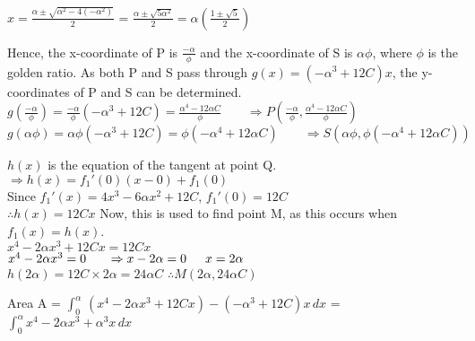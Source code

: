 \documentclass{homework}
\begin{document}
\begin{flushleft}
\begin{paracol}{2}
$x=\frac{\alpha\pm \sqrt{\alpha^2-4(-\alpha^2)}}{2}$ = $\frac{\alpha\pm \sqrt{5\alpha^2}}{2}=\alpha(\frac{1\pm\sqrt{5}}{2})$ 
\end{paracol}
\vspace{1.7em}
Hence, the x-coordinate of P is $\frac{-\alpha}{\phi}$ and the x-coordinate of S is $\alpha\phi$, where $\phi$ is the golden ratio. As both P and S pass through $g(x)=(-\alpha^3+12C)x$, the y-coordinates of P and S can be determined. \vspace{1em} \\
$g(\frac{-\alpha}{\phi})=\frac{-\alpha}{\phi}(-\alpha^3+12C)=\frac{\alpha^4-12\alpha C}{\phi} \hspace{2em} \Rightarrow P(\frac{-\alpha}{\phi}, \frac{\alpha^4-12\alpha C}{\phi})$ \vspace{0.6em} \\
$g(\alpha\phi)=\alpha\phi(-\alpha^3+12C)=\phi(-\alpha^4+12\alpha C)\hspace{2em} \Rightarrow S(\alpha\phi, \phi(-\alpha^4+12\alpha C))$ \vspace{1.7em} \\
\begin{paracol}{2}
    $h(x)$ is the equation of the tangent at point Q. \vspace{0.5em}\\
    $\Rightarrow h(x)=f_1'(0)(x-0)+f_1(0)$ \vspace{0.5em}\\
    Since $f_1'(x)=4x^3-6\alpha x^2+12C$, $f_1'(0)=12C$ \vspace{0.5em}\\
    $\therefore h(x)=12Cx$
    \switchcolumn
    Now, this is used to find point M, as this occurs when $f_1(x)=h(x)$. \vspace{0.8em} \\
    $x^4-2\alpha x^3+12Cx=12Cx$ \vspace{0.8em} \\
    $x^4-2\alpha x^3=0 \hspace{1.7em}\Rightarrow x-2\alpha =0 \hspace{1.5em} x=2\alpha $ \vspace{0.8em} \\
    $h(2\alpha)=12C \times 2\alpha= 24\alpha C$ \hspace{1em} $\therefore M(2\alpha, 24\alpha C)$
\end{paracol}
    \vspace{1.8em}
    Area A = $\int_0^\alpha \, (x^4-2\alpha x^3+12Cx)-(-\alpha^3+12C)x \, dx$ = $\int_0^\alpha x^4-2\alpha x^3+\alpha^3x \, dx$ \vspace{0.8em} \\

\end{flushleft}
\end{document}
